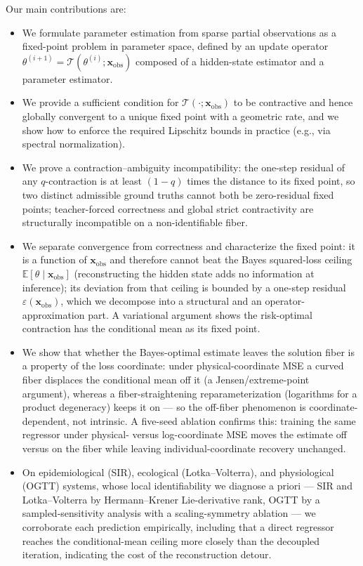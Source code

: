Our main contributions are:
\begin{itemize}
    \item We formulate parameter estimation from sparse partial observations as a fixed-point problem in parameter space, defined by an update operator $\theta^{(i+1)}=\mathcal{T}(\theta^{(i)};\mathbf{x}_{\mathrm{obs}})$ composed of a hidden-state estimator and a parameter estimator.
    \item We provide a sufficient condition for $\mathcal{T}(\cdot;\mathbf{x}_{\mathrm{obs}})$ to be contractive and hence globally convergent to a unique fixed point with a geometric rate, and we show how to enforce the required Lipschitz bounds in practice (e.g., via spectral normalization).
    \item We prove a contraction--ambiguity incompatibility: the one-step residual of any $q$-contraction is at least $(1-q)$ times the distance to its fixed point, so two distinct admissible ground truths cannot both be zero-residual fixed points; teacher-forced correctness and global strict contractivity are structurally incompatible on a non-identifiable fiber.
    \item  We separate convergence from correctness and characterize the fixed point: it is a function of $\mathbf{x}_{\mathrm{obs}}$ and therefore cannot beat the Bayes squared-loss ceiling $\mathbb{E}[\theta\mid\mathbf{x}_{\mathrm{obs}}]$ (reconstructing the hidden state adds no information at inference); its deviation from that ceiling is bounded by a one-step residual $\varepsilon(\mathbf{x}_{\mathrm{obs}})$, which we decompose into a structural and an operator-approximation part. A variational argument shows the risk-optimal contraction has the conditional mean as its fixed point.
    \item We show that whether the Bayes-optimal estimate leaves the solution fiber is a property of the loss coordinate: under physical-coordinate MSE a curved fiber displaces the conditional mean off it (a Jensen/extreme-point argument), whereas a fiber-straightening reparameterization (logarithms for a product degeneracy) keeps it on --- so the off-fiber phenomenon is coordinate-dependent, not intrinsic. A five-seed ablation confirms this: training the same regressor under physical- versus log-coordinate MSE moves the estimate off versus on the fiber while leaving individual-coordinate recovery unchanged.
    \item On epidemiological (SIR), ecological (Lotka--Volterra), and physiological (OGTT) systems, whose local identifiability we diagnose a priori --- SIR and Lotka--Volterra by Hermann--Krener Lie-derivative rank, OGTT by a sampled-sensitivity analysis with a scaling-symmetry ablation --- we corroborate each prediction empirically, including that a direct regressor reaches the conditional-mean ceiling more closely than the decoupled iteration, indicating the cost of the reconstruction detour.

\end{itemize}
